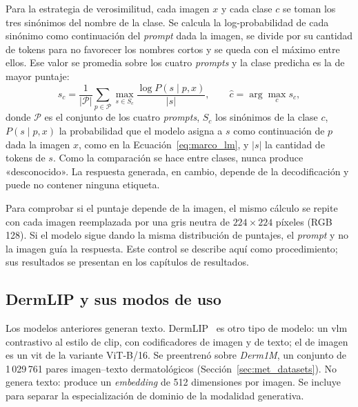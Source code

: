 Para la estrategia de verosimilitud, cada imagen $x$ y cada clase $c$ se toman los tres sinónimos del nombre de la clase.
Se calcula la log-probabilidad de cada sinónimo como continuación del \emph{prompt} dada la imagen, se divide por su
cantidad de tokens para no favorecer los nombres cortos y se queda con el máximo entre ellos. Ese valor se promedia sobre
los cuatro \emph{prompts} y la clase predicha es la de mayor puntaje:
\begin{equation}
    s_c = \frac{1}{|\mathcal{P}|} \sum_{p \in \mathcal{P}} \max_{s \in S_c} \frac{\log P(s \mid p, x)}{|s|},
    \qquad \hat{c} = \arg\max_{c} s_c,
    \label{eq:met_likelihood}
\end{equation}
donde $\mathcal{P}$ es el conjunto de los cuatro \emph{prompts}, $S_c$ los sinónimos de la clase $c$, $P(s \mid p, x)$ la
probabilidad que el modelo asigna a $s$ como continuación de $p$ dada la imagen $x$, como en la
Ecuación~\ref{eq:marco_lm}, y $|s|$ la cantidad de tokens de $s$. Como la comparación se hace entre clases, nunca produce
«desconocido». La respuesta generada, en cambio, depende de la decodificación y puede no contener ninguna etiqueta.

Para comprobar si el puntaje depende de la imagen, el mismo cálculo se repite con cada imagen reemplazada por una gris
neutra de $224 \times 224$ píxeles (RGB 128). Si el modelo sigue dando la misma distribución de puntajes, el \emph{prompt}
y no la imagen guía la respuesta. Este control se describe aquí como procedimiento; sus resultados se presentan en los
capítulos de resultados.

\subsection{DermLIP y sus modos de uso}
\label{sec:met_dermlip}

Los modelos anteriores generan texto. DermLIP~\cite{yan2025derm1miccv} es otro tipo de modelo: un \gls{vlm} contrastivo
al estilo de \gls{clip}, con codificadores de imagen y de texto; el de imagen es un \gls{vit} de la variante ViT-B/16.
Se preentrenó sobre \emph{Derm1M}, un conjunto de 1\,029\,761 pares imagen--texto dermatológicos
(Sección~\ref{sec:met_datasets}). No genera texto: produce un
\emph{embedding} de 512 dimensiones por imagen. Se incluye para separar la especialización de dominio de la modalidad
generativa.

